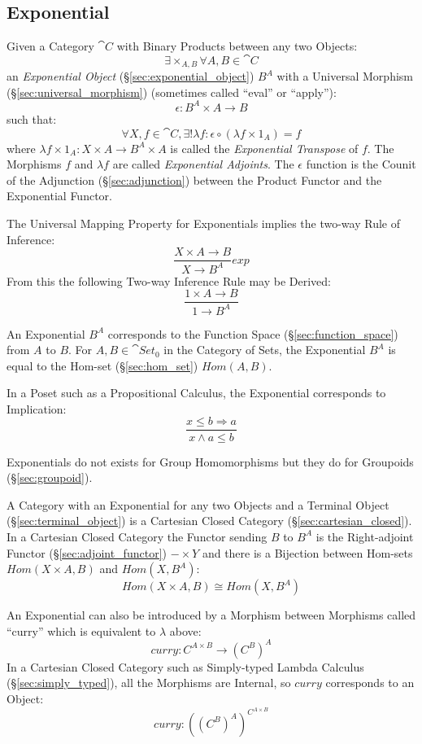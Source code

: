 \subsection{Exponential}\label{sec:category_exponential}

Given a Category $\cat{C}$ with Binary Products between any two
Objects:
\[
  \exists \times_{A,B} \forall A,B \in \cat{C}
\]
an \emph{Exponential Object} (\S\ref{sec:exponential_object}) $B^A$
with a Universal Morphism (\S\ref{sec:universal_morphism}) (sometimes
called ``eval'' or ``apply''):
\[
  \epsilon : B^A \times A \rightarrow B
\]
such that:
\[
  \forall X, f \in \cat{C}, \exists ! \lambda f :
  \epsilon \circ (\lambda f \times 1_A) = f
\]
where $\lambda f \times 1_A : X \times A \rightarrow B^A \times A$ is
called the \emph{Exponential Transpose} of $f$. The Morphisms $f$ and
$\lambda f$ are called \emph{Exponential Adjoints}. The $\epsilon$
function is the Counit of the Adjunction (\S\ref{sec:adjunction}) between
the Product Functor and the Exponential Functor.

The Universal Mapping Property for Exponentials implies the two-way
Rule of Inference:
\[
  {
    \frac{X \times A \rightarrow B}
    {X \rightarrow B^A}
  }exp
\]
From this the following Two-way Inference Rule may be Derived:
\[
    \frac{1 \times A \rightarrow B}
    {1 \rightarrow B^A}
\]

An Exponential $B^A$ corresponds to the Function Space
(\S\ref{sec:function_space}) from $A$ to $B$. For $A,B \in
\cat{Set}_0$ in the Category of Sets, the Exponential $B^A$ is
equal to the Hom-set (\S\ref{sec:hom_set}) $Hom(A,B)$.

In a Poset such as a Propositional Calculus, the Exponential
corresponds to Implication:
\[
    \frac{x \leq b \Rightarrow a}
    {x \wedge a \leq b}
\]

Exponentials do not exists for Group Homomorphisms but they do for
Groupoids (\S\ref{sec:groupoid}).

A Category with an Exponential for any two Objects and a Terminal
Object (\S\ref{sec:terminal_object}) is a Cartesian Closed Category
(\S\ref{sec:cartesian_closed}). In a Cartesian Closed Category the
Functor sending $B$ to $B^A$ is the Right-adjoint Functor
(\S\ref{sec:adjoint_functor}) $- \times Y$ and there is a Bijection
between Hom-sets $Hom(X \times A, B)$ and $Hom(X, B^A)$:
\[
  Hom(X \times A, B) \cong Hom(X, B^A)
\]

An Exponential can also be introduced by a Morphism between Morphisms
called ``curry'' which is equivalent to $\lambda$ above:
\[
  curry : C^{A \times B} \rightarrow (C^B)^A
\]
In a Cartesian Closed Category such as Simply-typed Lambda Calculus
(\S\ref{sec:simply_typed}), all the Morphisms are Internal, so $curry$
corresponds to an Object:
\[
  curry : ((C^B)^A)^{C^{A \times B}}
\]




